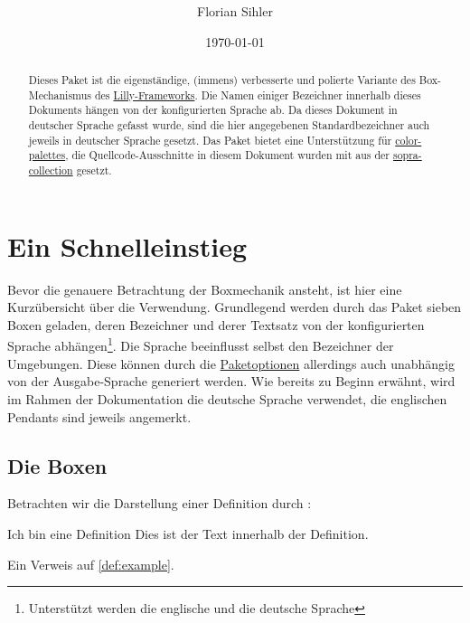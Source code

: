 \documentclass[ngerman]{article}
\title{\textsf{\paletteD{\{}\paletteA{lithie-boxes}\paletteD{\}}}}
\author{Florian Sihler}
\date{\today}
\def\env#1{\texttt{\paletteB{#1}}}
\def\envref#1{\hyperref[env:#1]{\env{#1}}}
\begin{document}
\maketitle

\begin{abstract}
    Dieses Paket ist die eigenständige, (immens) verbesserte und polierte Variante des Box-Mechanismus des \href{https://github.com/EagleoutIce/LILLY}{Lilly-Frameworks}. Die Namen einiger Bezeichner innerhalb dieses Dokuments hängen von der konfigurierten Sprache ab. Da dieses Dokument in deutscher Sprache gefasst wurde, sind die hier angegebenen Standardbezeichner auch jeweils in deutscher Sprache gesetzt. Das Paket bietet eine Unterstützung für \href{https://github.com/EagleoutIce/color-palettes}{color-palettes}, die Quellcode-Ausschnitte in diesem Dokument wurden mit  aus der \href{https://github.com/EagleoutIce/sopra-collection}{sopra-collection} gesetzt.
\end{abstract}

\tableofcontents

\section{Ein Schnelleinstieg}

Bevor die genauere Betrachtung der Boxmechanik ansteht, ist hier eine Kurzübersicht über die Verwendung. Grundlegend werden durch das Paket sieben Boxen geladen, deren Bezeichner und derer Textsatz von der konfigurierten Sprache abhängen\footnote{Unterstützt werden die englische und die deutsche Sprache}.
Die Sprache beeinflusst selbst den Bezeichner der Umgebungen. Diese können durch die \hyperref[sec:packetoptions]{Paketoptionen} allerdings auch unabhängig von der Ausgabe-Sprache generiert werden.
Wie bereits zu Beginn erwähnt, wird im Rahmen der Dokumentation die deutsche Sprache verwendet, die englischen Pendants
sind jeweils angemerkt.

\subsection{Die Boxen}

Betrachten wir die Darstellung einer Definition durch \envref{definition}:

\begin{latex}
\begin{definition}[Referenztitel]{Ich bin eine Definition}
    \label{def:example}Dies ist der Text innerhalb der Definition.
\end{definition}

Ein Verweis auf \autoref{def:example}.
\end{latex}
\end{document}
